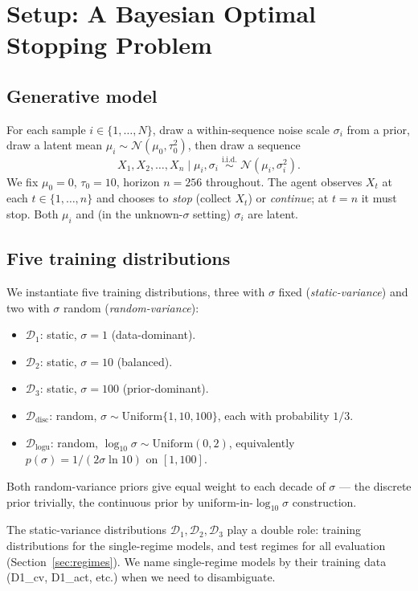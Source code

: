 \documentclass[11pt]{article}
\begin{document}
\section{Setup: A Bayesian Optimal Stopping Problem}
\label{sec:setup}

\subsection{Generative model}

For each sample $i \in \{1, \ldots, N\}$, draw a within-sequence noise scale $\sigma_i$ from a prior, draw a latent mean $\mu_i \sim \mathcal{N}(\mu_0, \tau_0^2)$, then draw a sequence
\[
X_1, X_2, \ldots, X_n \mid \mu_i, \sigma_i \;\overset{\text{i.i.d.}}{\sim}\; \mathcal{N}(\mu_i, \sigma_i^2).
\]
We fix $\mu_0 = 0$, $\tau_0 = 10$, horizon $n = 256$ throughout. The agent observes $X_t$ at each $t \in \{1, \ldots, n\}$ and chooses to \emph{stop} (collect $X_t$) or \emph{continue}; at $t = n$ it must stop. Both $\mu_i$ and (in the unknown-$\sigma$ setting) $\sigma_i$ are latent.

\subsection{Five training distributions}

We instantiate five training distributions, three with $\sigma$ fixed (\emph{static-variance}) and two with $\sigma$ random (\emph{random-variance}):
\begin{itemize}
\item $\mathcal{D}_1$: static, $\sigma = 1$ (data-dominant).
\item $\mathcal{D}_2$: static, $\sigma = 10$ (balanced).
\item $\mathcal{D}_3$: static, $\sigma = 100$ (prior-dominant).
\item $\mathcal{D}_{\mathrm{disc}}$: random, $\sigma \sim \mathrm{Uniform}\{1, 10, 100\}$, each with probability $1/3$.
\item $\mathcal{D}_{\mathrm{logu}}$: random, $\log_{10}\sigma \sim \mathrm{Uniform}(0, 2)$, equivalently $p(\sigma) = 1/(2\sigma\ln 10)$ on $[1, 100]$.
\end{itemize}
Both random-variance priors give equal weight to each decade of $\sigma$ --- the discrete prior trivially, the continuous prior by uniform-in-$\log_{10}\sigma$ construction.

The static-variance distributions $\mathcal{D}_1, \mathcal{D}_2, \mathcal{D}_3$ play a double role: training distributions for the single-regime models, and test regimes for all evaluation (Section~\ref{sec:regimes}). We name single-regime models by their training data (D1\_cv, D1\_act, etc.) when we need to disambiguate.
\end{document}
